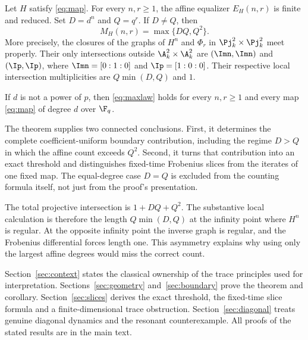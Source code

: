 \begin{theorem}\label{thm:main}
Let $H$ satisfy \eqref{eq:map}. For every $n,r\geq1$, the affine equalizer
$E_H(n,r)$ is finite and reduced. Set $D=d^n$ and $Q=q^r$. If $D\ne Q$,
then
\begin{equation}\label{eq:maxlaw}
 \boxed{M_H(n,r)=\max\{DQ,Q^2\}.}
\end{equation}
More precisely, the closures of the graphs of $H^n$ and $\Phi_r$ in
$\Pj^2_k\times\Pj^2_k$ meet properly. Their only intersections outside
$\A^2_k\times\A^2_k$ are
$(\Imn,\Imn)$ and $(\Ip,\Ip)$, where
$\Imn=[0:1:0]$ and $\Ip=[1:0:0]$. Their respective local intersection
multiplicities are $Q\min(D,Q)$ and $1$.
\end{theorem}

\begin{corollary}\label{cor:allclocks}
If $d$ is not a power of $p$, then \eqref{eq:maxlaw} holds for every
$n,r\geq1$ and every map \eqref{eq:map} of degree $d$ over $\F_q$.
\end{corollary}

The theorem supplies two connected conclusions. First, it determines the
complete coefficient-uniform boundary contribution, including the regime
$D>Q$ in which the affine count exceeds $Q^2$. Second, it turns that
contribution into an exact threshold and distinguishes fixed-time
Frobenius slices from the iterates of one fixed map. The equal-degree
case $D=Q$ is excluded from the counting formula itself, not just from
the proof's presentation.

The total projective intersection is $1+DQ+Q^2$. The substantive local
calculation is therefore the length $Q\min(D,Q)$ at the infinity point
where $H^n$ is regular. At the opposite infinity point the inverse graph
is regular, and the Frobenius differential forces length one. This
asymmetry explains why using only the largest affine degrees would miss
the correct count.

Section~\ref{sec:context} states the classical ownership of the trace
principles used for interpretation. Sections~\ref{sec:geometry}
and~\ref{sec:boundary} prove the theorem and corollary.
Section~\ref{sec:slices} derives the exact threshold, the fixed-time
slice formula and a finite-dimensional trace obstruction.
Section~\ref{sec:diagonal} treats genuine diagonal dynamics and the
resonant counterexample. All proofs of the stated results are in the
main text.
